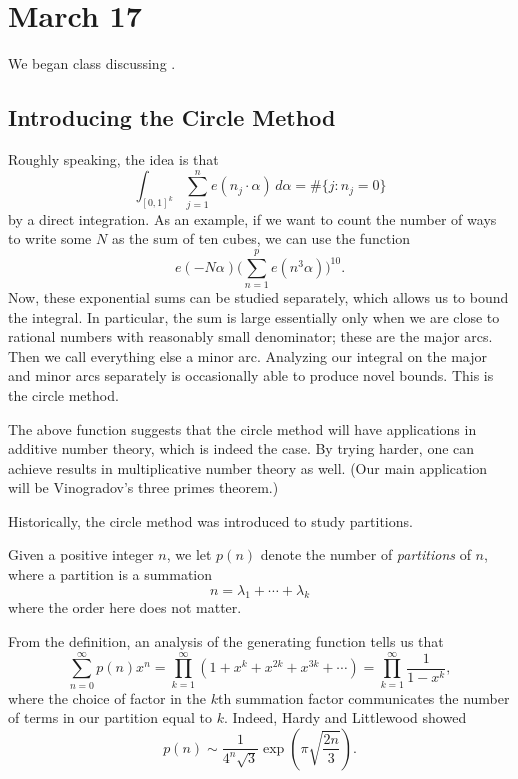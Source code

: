 \documentclass[../notes.tex]{subfiles}
\begin{document}
\section{March 17}

We began class discussing .

\subsection{Introducing the Circle Method}
Roughly speaking, the idea is that
\[\int_{[0,1]^k}\sum_{j=1}^ne\left(n_j\cdot\alpha\right)\,d\alpha=\#\{j:n_j=0\}\]
by a direct integration. As an example, if we want to count the number of ways to write some $N$ as the sum of ten cubes, we can use the function
\[e(-N\alpha)\Bigg(\sum_{n=1}^pe\left(n^3\alpha\right)\Bigg)^{10}.\]
Now, these exponential sums can be studied separately, which allows us to bound the integral. In particular, the sum is large essentially only when we are close to rational numbers with reasonably small denominator; these are the major arcs. Then we call everything else a minor arc. Analyzing our integral on the major and minor arcs separately is occasionally able to produce novel bounds. This is the circle method.
\begin{remark}
	The above function suggests that the circle method will have applications in additive number theory, which is indeed the case. By trying harder, one can achieve results in multiplicative number theory as well. (Our main application will be Vinogradov's three primes theorem.)
\end{remark}
Historically, the circle method was introduced to study partitions.
\begin{definition}[partition]
	Given a positive integer $n$, we let $p(n)$ denote the number of \textit{partitions} of $n$, where a partition is a summation
	\[n=\lambda_1+\cdots+\lambda_k\]
	where the order here does not matter.
\end{definition}
From the definition, an analysis of the generating function tells us that
\[\sum_{n=0}^\infty p(n)x^n=\prod_{k=1}^\infty\left(1+x^k+x^{2k}+x^{3k}+\cdots\right)=\prod_{k=1}^\infty\frac1{1-x^k},\]
where the choice of factor in the $k$th summation factor communicates the number of terms in our partition equal to $k$. Indeed, Hardy and Littlewood showed
\[p(n)\sim\frac1{4^n\sqrt3}\exp\left(\pi\sqrt{\frac{2n}3}\right).\]
\end{document}
